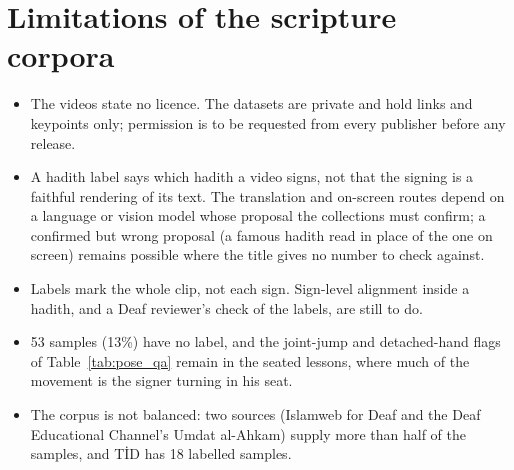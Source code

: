 \section{Limitations of the scripture corpora}
\begin{itemize}[leftmargin=*,itemsep=2pt]
  \item The videos state no licence. The datasets are private and hold links and keypoints only; permission is to be
        requested from every publisher before any release.
  \item A hadith label says which hadith a video signs, not that the signing is a faithful rendering of its text. The
        translation and on-screen routes depend on a language or vision model whose proposal the collections must
        confirm; a confirmed but wrong proposal (a famous hadith read in place of the one on screen) remains possible
        where the title gives no number to check against.
  \item Labels mark the whole clip, not each sign. Sign-level alignment inside a hadith, and a Deaf reviewer's check of
        the labels, are still to do.
  \item 53 samples (13\%) have no label, and the joint-jump and detached-hand flags of Table~\ref{tab:pose_qa} remain in
        the seated lessons, where much of the movement is the signer turning in his seat.
  \item The corpus is not balanced: two sources (Islamweb for Deaf and the Deaf Educational Channel's Umdat al-Ahkam)
        supply more than half of the samples, and T\.{I}D has 18 labelled samples.
\end{itemize}
